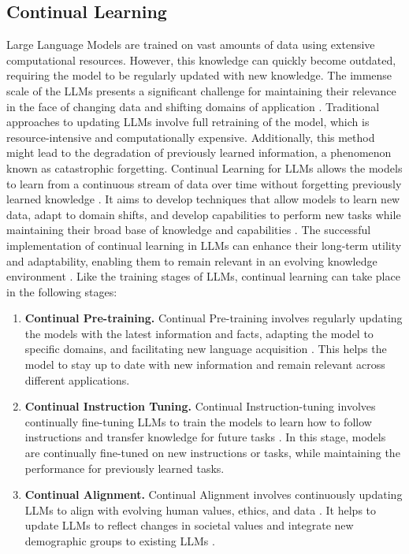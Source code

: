 \subsection{Continual Learning}
Large Language Models are trained on vast amounts of data using extensive computational resources. However, this knowledge can quickly become outdated, requiring the model to be regularly updated with new knowledge. The immense scale of the LLMs presents a significant challenge for maintaining their relevance in the face of changing data and shifting domains of application \cite{shi2024continual}. Traditional approaches to updating LLMs involve full retraining of the model, which is resource-intensive and computationally expensive. Additionally, this method might lead to the degradation of previously learned information, a phenomenon known as catastrophic forgetting. Continual Learning for LLMs allows the models to learn from a continuous stream of data over time without forgetting previously learned knowledge \cite{wu2024continual}. It aims to develop techniques that allow models to learn new data, adapt to domain shifts, and develop capabilities to perform new tasks while maintaining their broad base of knowledge and capabilities \cite{parisi2019continual}. The successful implementation of continual learning in LLMs can enhance their long-term utility and adaptability, enabling them to remain relevant in an evolving knowledge environment \cite{de2021continual}. Like the training stages of LLMs, continual learning can take place in the following stages:
\begin{enumerate}
\item \textbf{Continual Pre-training.} Continual Pre-training involves regularly updating the models with the latest information and facts, adapting the model to specific domains, and facilitating new language acquisition \cite{gogoulou2023study}. This helps the model to stay up to date with new information and remain relevant across different applications. 
\item \textbf{Continual Instruction Tuning.} Continual Instruction-tuning involves continually fine-tuning LLMs to train the models to learn how to follow instructions and transfer knowledge for future tasks \cite{wu2024continual}. In this stage, models are continually fine-tuned on new instructions or tasks, while maintaining the performance for previously learned tasks.  
\item \textbf{Continual Alignment.} Continual Alignment involves continuously updating LLMs to align with evolving human values, ethics, and data \cite{shi2024continual}. It helps to update LLMs to reflect changes in societal values and integrate new demographic groups to existing LLMs \cite{wu2024continual}. 
\end{enumerate}

